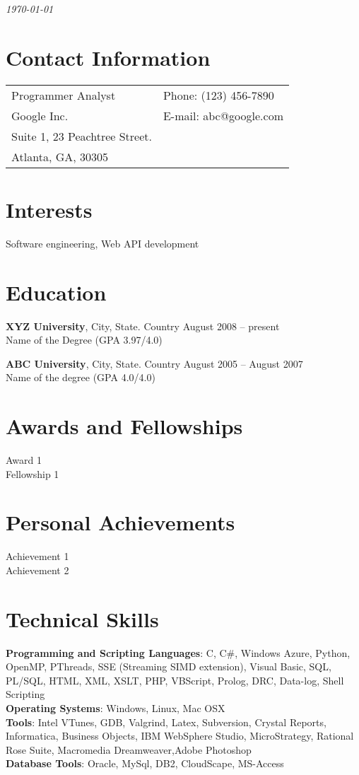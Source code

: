 \documentclass[margin,line]{res}
\begin{document}
 \hfill {\em \today}

\begin{resume}
\section{\sc Contact Information}

\vspace{.05in}
\begin{tabular}{@{}p{3.5in}p{3in}}
Programmer Analyst             & {Phone:}  (123) 456-7890 \\
Google Inc. 
 & {E-mail:}  abc@google.com\\
Suite 1, 23 Peachtree Street.\\
Atlanta, GA, 30305  
\end{tabular}


\section{\sc Interests}

Software engineering, Web API development

\section{\sc Education}
{\bf XYZ University}, City, State. Country \hfill August 2008 -- present\\
Name of the Degree \hfill(GPA 3.97/4.0)

{\bf ABC University}, City, State. Country \hfill August 2005 -- August 2007\\
Name of the degree \hfill(GPA 4.0/4.0)

\section{\sc Awards and Fellowships}
Award 1\\
Fellowship 1\\
\section{\sc Personal Achievements}
Achievement 1\\
Achievement 2\\
\section{\sc Technical Skills}
{\bf Programming and Scripting Languages}:  C, C\#, Windows Azure, Python, OpenMP, PThreads, SSE (Streaming SIMD extension), Visual Basic, SQL, PL/SQL, HTML, XML, XSLT, PHP, VBScript, Prolog, DRC, Data-log, Shell Scripting\\
{\bf Operating Systems}: Windows, Linux, Mac OSX\\
{\bf Tools}: Intel VTunes, GDB, Valgrind, Latex, Subversion, Crystal Reports, Informatica, Business Objects, IBM WebSphere Studio, MicroStrategy, Rational Rose Suite, Macromedia Dreamweaver,Adobe Photoshop \\
{\bf Database Tools}: Oracle, MySql, DB2, CloudScape, MS-Access 

\end{resume}
\end{document}
